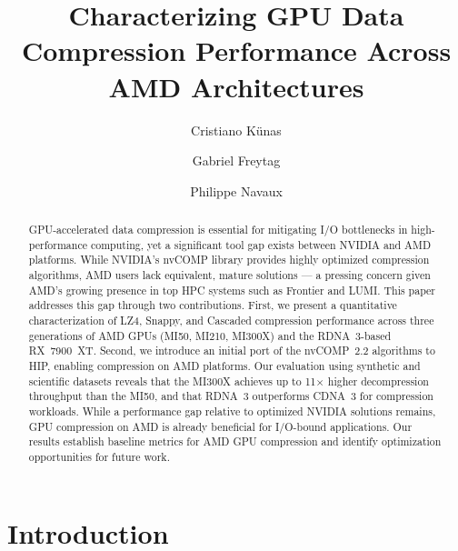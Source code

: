 \documentclass[runningheads]{llncs}
\begin{document}
\title{Characterizing GPU Data Compression Performance Across AMD Architectures}

\author{Cristiano Künas \and
Gabriel Freytag \and
Philippe Navaux}



\maketitle

\begin{abstract}
GPU-accelerated data compression is essential for mitigating I/O bottlenecks in high-performance computing, yet a significant tool gap exists between NVIDIA and AMD platforms. While NVIDIA's nvCOMP library provides highly optimized compression algorithms, AMD users lack equivalent, mature solutions — a pressing concern given AMD's growing presence in top HPC systems such as Frontier and LUMI. This paper addresses this gap through two contributions. First, we present a quantitative characterization of LZ4, Snappy, and Cascaded compression performance across three generations of AMD GPUs (MI50, MI210, MI300X) and the RDNA~3-based RX~7900~XT. Second, we introduce an initial port of the nvCOMP~2.2 algorithms to HIP, enabling compression on AMD platforms. Our evaluation using synthetic and scientific datasets reveals that the MI300X achieves up to 11$\times$ higher decompression throughput than the MI50, and that RDNA~3 outperforms CDNA~3 for compression workloads. While a performance gap relative to optimized NVIDIA solutions remains, GPU compression on AMD is already beneficial for I/O-bound applications. Our results establish baseline metrics for AMD GPU compression and identify optimization opportunities for future work.

\end{abstract}


\section{Introduction}
\label{sec:introduction}
\end{document}
